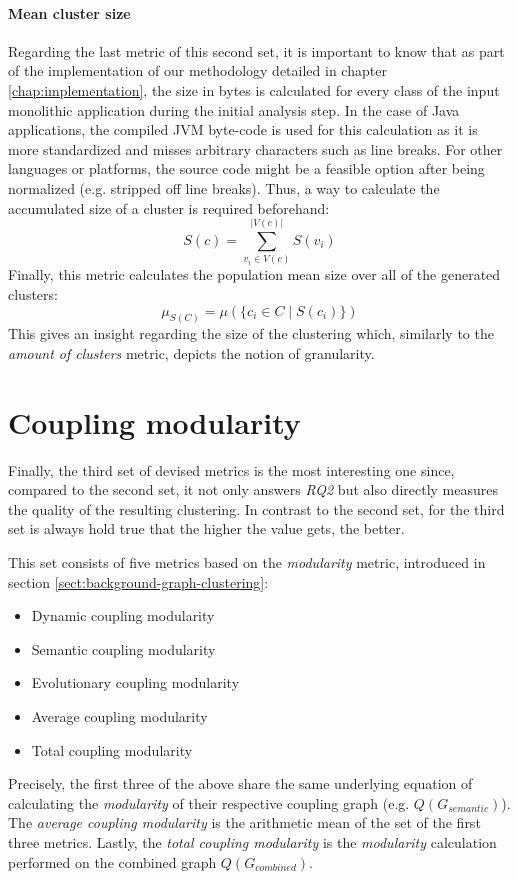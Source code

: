 \documentclass[12pt,a4paper]{report}
\begin{document}
\paragraph{Mean cluster size}
Regarding the last metric of this second set, it is important to know that
as part of the implementation of our methodology detailed in chapter
\ref{chap:implementation}, the size in bytes is calculated for every class
of the input monolithic application during the initial analysis step.
In the case of Java applications, the compiled JVM byte-code is used for this
calculation as it is more standardized and misses arbitrary characters such as
line breaks. For other languages or platforms, the source code might be a
feasible option after being normalized (e.g. stripped off line breaks).
Thus, a way to calculate the accumulated size of a cluster is required beforehand:
\[
  S(c) = \sum_{v_i \in V(c)}^{\vert V(c) \vert} S(v_i)
\]
Finally, this metric calculates the population mean size over all of the
generated clusters:
\[
  \mu_{S(C)} = \mu(\{ c_i \in C \mid S(c_i) \})
\]
This gives an insight regarding the size of the clustering which, similarly to
the \textit{amount of clusters} metric, depicts the notion of granularity.



\section{Coupling modularity}

Finally, the third set of devised metrics is the most interesting one since,
compared to the second set, it not only answers \textit{RQ2} but also directly
measures the quality of the resulting clustering.
In contrast to the second set, for the third set is always hold true that
the higher the value gets, the better.

This set consists of five metrics based on the \textit{modularity} metric,
introduced in section \ref{sect:background-graph-clustering}:
\begin{itemize}[noitemsep]
  \item Dynamic coupling modularity
  \item Semantic coupling modularity
  \item Evolutionary coupling modularity
  \item Average coupling modularity
  \item Total coupling modularity
\end{itemize}
Precisely, the first three of the above share the same underlying equation
of calculating the \textit{modularity} of their respective coupling graph
(e.g. \(Q(G_{semantic})\)).
The \textit{average coupling modularity} is the arithmetic mean
of the set of the first three metrics.
Lastly, the \textit{total coupling modularity} is the \textit{modularity}
calculation performed on the combined graph \(Q(G_{combined})\).
\end{document}
